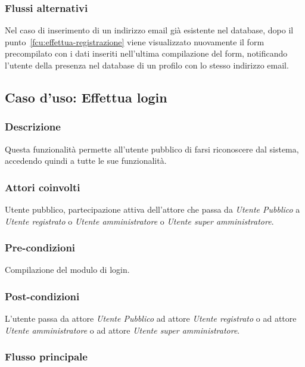 	\subsubsection*{Flussi alternativi}
	Nel caso di inserimento di un indirizzo email già esistente nel database, dopo il punto~\ref{fcu:effettua-registrazione} viene visualizzato nuovamente il form precompilato con i dati inseriti nell'ultima compilazione del form, notificando l'utente della presenza nel database di un profilo con lo stesso indirizzo email.

%
%
\subsection{Caso d'uso: Effettua login}

	\subsubsection*{Descrizione}
	Questa funzionalità permette all'utente pubblico di farsi riconoscere dal sistema, accedendo quindi a tutte le sue funzionalità.
	
	\subsubsection*{Attori coinvolti}
	Utente pubblico, partecipazione attiva dell'attore che passa da \emph{Utente Pubblico} a \emph{Utente registrato} o \emph{Utente amministratore} o \emph{Utente super amministratore}.
	
	\subsubsection*{Pre-condizioni}
	Compilazione del modulo di login.
	
	\subsubsection*{Post-condizioni}
	L'utente passa da attore \emph{Utente Pubblico} ad attore \emph{Utente registrato} o ad attore \emph{Utente amministratore} o ad attore \emph{Utente super amministratore}.
	
	\subsubsection*{Flusso principale}
	
